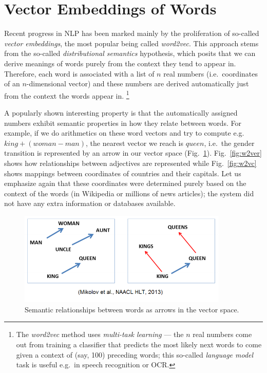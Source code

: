 \section{Vector Embeddings of Words}
\label{sec:embeddings}

Recent progress in NLP has been marked mainly by the proliferation of
so-called \textit{vector embeddings}, the most popular being called
\textit{word2vec}. \citep{word2vec}
This approach stems from the so-called \textit{distributional semantics}
hypothesis, which posits that we can derive meanings of words purely
from the context they tend to appear in.  Therefore, each word is
associated with a list of $n$ real numbers (i.e.\ coordinates of
an $n$-dimensional vector) and these numbers are derived automatically
just from the context the words appear in.%
\footnote{The \textit{word2vec} method uses \textit{multi-task learning}
	--- the $n$ real numbers
	come out from training a classifier that predicts the most likely
	next words to come given a context of (say, 100) preceding words;
	this so-called \textit{language model} task is useful e.g.\ in
	speech recognition or OCR.}

A popularly shown interesting property is that the automatically assigned numbers
exhibit semantic properties in how they relate between words.
For example, if we do arithmetics on these word vectors and try
to compute e.g.\ $king + (woman - man)$, the nearest vector we reach
is $queen$, i.e.\ the gender transition is represented by an arrow
in our vector space (Fig.~\ref{fig:w2vg}).
Fig.~\ref{fig:w2ver} shows how relationships between adjectives are represented
while Fig.~\ref{fig:w2vc} shows mappings between coordinates of countries
and their capitals.  Let us emphasize again that these coordinates were
determined purely based on the context of the words (in Wikipedia or
millions of news articles); the system did not have any extra information
or databases available.

\begin{figure}[ht]
	\centering
	\includegraphics[width=10cm]{kingqueen.png}
	\caption{Semantic relationships between words as arrows in the vector space. \citep{WordVecLingReg}}
	\label{fig:w2vg}
\end{figure}

